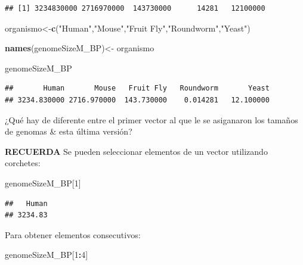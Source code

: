 \documentclass[
]{book}
\newenvironment{Shaded}{\begin{snugshade}}{\end{snugshade}}
\newcommand{\DecValTok}[1]{\textcolor[rgb]{0.00,0.00,0.81}{#1}}
\newcommand{\FunctionTok}[1]{\textcolor[rgb]{0.13,0.29,0.53}{\textbf{#1}}}
\newcommand{\NormalTok}[1]{#1}
\newcommand{\OtherTok}[1]{\textcolor[rgb]{0.56,0.35,0.01}{#1}}
\newcommand{\SpecialCharTok}[1]{\textcolor[rgb]{0.81,0.36,0.00}{\textbf{#1}}}
\newcommand{\StringTok}[1]{\textcolor[rgb]{0.31,0.60,0.02}{#1}}
\begin{document}
\begin{verbatim}
## [1] 3234830000 2716970000  143730000      14281   12100000
\end{verbatim}

\begin{Shaded}
\begin{Highlighting}[]
\NormalTok{organismo}\OtherTok{\textless{}{-}}\FunctionTok{c}\NormalTok{(}\StringTok{"Human"}\NormalTok{,}\StringTok{"Mouse"}\NormalTok{,}\StringTok{"Fruit Fly"}\NormalTok{,}\StringTok{"Roundworm"}\NormalTok{,}\StringTok{"Yeast"}\NormalTok{)}
\end{Highlighting}
\end{Shaded}

\begin{Shaded}
\begin{Highlighting}[]
\FunctionTok{names}\NormalTok{(genomeSizeM\_BP)}\OtherTok{\textless{}{-}}\NormalTok{ organismo}
\end{Highlighting}
\end{Shaded}

\begin{Shaded}
\begin{Highlighting}[]
\NormalTok{genomeSizeM\_BP}
\end{Highlighting}
\end{Shaded}

\begin{verbatim}
##       Human       Mouse   Fruit Fly   Roundworm       Yeast 
## 3234.830000 2716.970000  143.730000    0.014281   12.100000
\end{verbatim}

¿Qué hay de diferente entre el primer vector al que le se asiganaron los tamaños de genomas \& esta última versión?

\textbf{RECUERDA}
Se pueden seleccionar elementos de un vector utilizando corchetes:

\begin{Shaded}
\begin{Highlighting}[]
\NormalTok{genomeSizeM\_BP[}\DecValTok{1}\NormalTok{]}
\end{Highlighting}
\end{Shaded}

\begin{verbatim}
##   Human 
## 3234.83
\end{verbatim}

Para obtener elementos consecutivos:

\begin{Shaded}
\begin{Highlighting}[]
\NormalTok{genomeSizeM\_BP[}\DecValTok{1}\SpecialCharTok{:}\DecValTok{4}\NormalTok{]}
\end{Highlighting}
\end{Shaded}
\end{document}
